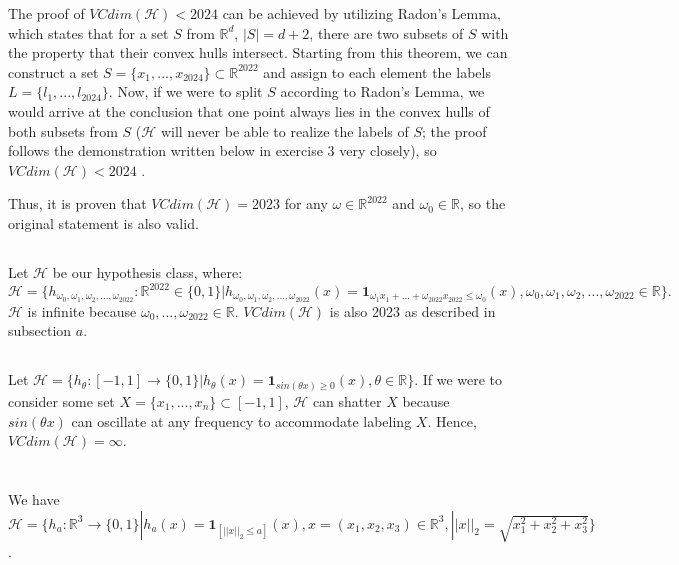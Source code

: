 \documentclass{article}
\newcounter{theorem}
\begin{document}
The proof of $VCdim(\mathcal{H}) < 2024$ can be achieved by utilizing Radon's Lemma, which states that for a set $S$ from $\mathbb{R}^d$, $|S|=d+2$, there are two subsets of $S$ with the property that their convex hulls intersect. Starting from this theorem, we can construct a set $S=\{x_1,...,x_{2024}\}\subset \mathbb{R}^{2022}$ and assign to each element the labels $L=\{l_1,...,l_{2024}\}$. Now, if we were to split $S$ according to Radon's Lemma, we would arrive at the conclusion that one point always lies in the convex hulls of both subsets from $S$ ($\mathcal{H}$ will never be able to realize the labels of $S$; the proof follows the demonstration written below in exercise 3 very closely), so $VCdim(\mathcal{H}) < 2024$ \cite{vcdim2023}.

Thus, it is proven that $VCdim(\mathcal{H})=2023$ for any $\omega\in\mathbb{R}^{2022}$ and $\omega_0 \in \mathbb{R}$, so the original statement is also valid.
\subsection{}
Let $\mathcal{H}$ be our hypothesis class, where:
$
\mathcal{H}=\{h_{\omega_0, \omega_1,\omega_2,...,\omega_{2022}}:\mathbb{R}^{2022}\in\{0,1\}|h_{\omega_0, \omega_1,\omega_2,...,\omega_{2022}}(x) = \mathbf{1}_{\omega_1x_1 + ... + \omega_{2022}x_{2022} \leq \omega_0}(x), \omega_0, \omega_1,\omega_2,...,\omega_{2022}\in \mathbb{R}\}.
$
$\mathcal{H}$ is infinite because $\omega_0,...,\omega_{2022}\in\mathbb{R}$. $VCdim(\mathcal{H})$ is also 2023 as described in subsection $a$.
\subsection{}
Let $\mathcal{H}=\{ h_\theta:[-1,1]\rightarrow\{0,1\}|h_\theta(x)=\mathbf{1}_{sin(\theta x) \geq 0}(x), \theta \in \mathbb{R}\}$. If we were to consider some set $X=\{x_1,...,x_n\}\subset[-1,1]$, $\mathcal{H}$ can shatter $X$ because $sin(\theta x)$ can oscillate at any frequency to accommodate labeling $X$. Hence, $VCdim(\mathcal{H})=\infty$. 

\section{}
We have $\mathcal{H}=\{ h_a:\mathbb{R}^3\rightarrow \{0,1\}|h_a(x)=\mathbf{1}_{[||x||_2\leq a]}(x), x=(x_1,x_2,x_3)\in\mathbb{R}^3, ||x||_2 = \sqrt{x_1^2+x_2^2+x_3^2} \}$.
\end{document}
